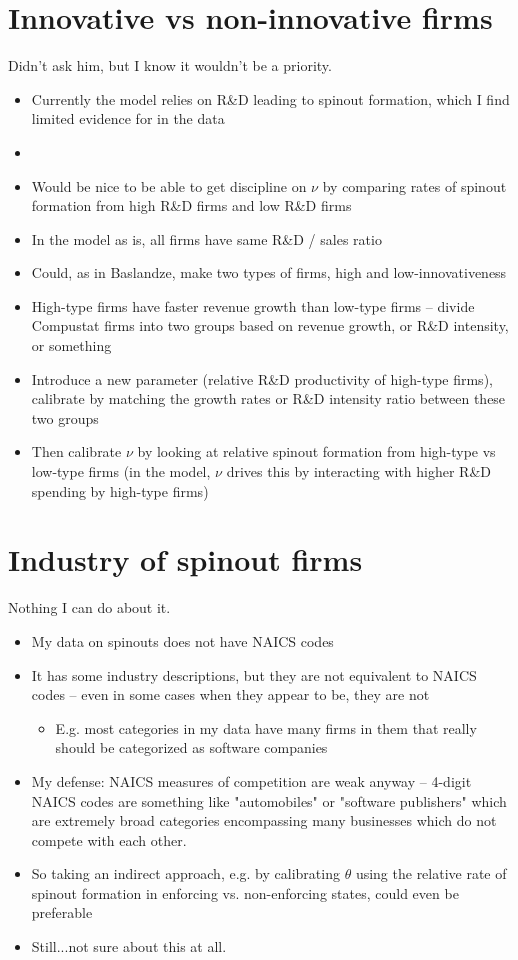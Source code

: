 \documentclass[12pt,english]{article}
\theoremstyle{remark}
\begin{document}
\section{Innovative vs non-innovative firms}

Didn't ask him, but I know it wouldn't be a priority.

\begin{itemize}
	\item Currently the model relies on R\&D leading to spinout formation, which I find limited evidence for in the data
	\item 
	\item Would be nice to be able to get discipline on $\nu$ by comparing rates of spinout formation from high R\&D firms and low R\&D firms
	\item In the model as is, all firms have same R\&D / sales ratio
	\item Could, as in Baslandze, make two types of firms, high and low-innovativeness
	\item High-type firms have faster revenue growth than low-type firms -- divide Compustat firms into two groups based on revenue growth, or R\&D intensity, or something
	\item Introduce a new parameter (relative R\&D productivity of high-type firms), calibrate by matching the growth rates or R\&D intensity ratio between these two groups
	\item Then calibrate $\nu$ by looking at relative spinout formation from high-type vs low-type firms (in the model, $\nu$ drives this by interacting with higher R\&D spending by high-type firms)
\end{itemize}


\section{Industry of spinout firms}

Nothing I can do about it.

\begin{itemize}
	\item My data on spinouts does not have NAICS codes
	\item It has some industry descriptions, but they are not equivalent to NAICS codes -- even in some cases when they appear to be, they are not
	\begin{itemize}
		\item E.g. most categories in my data have many firms in them that really should be categorized as software companies
	\end{itemize}
	\item My defense: NAICS measures of competition are weak anyway -- 4-digit NAICS codes are something like "automobiles" or "software publishers" which are extremely broad categories encompassing many businesses which do not compete with each other. 
	\item So taking an indirect approach, e.g. by calibrating $\theta$ using the relative rate of spinout formation in enforcing vs. non-enforcing states, could even be preferable
	\item Still...not sure about this at all. 
\end{itemize}
\end{document}
